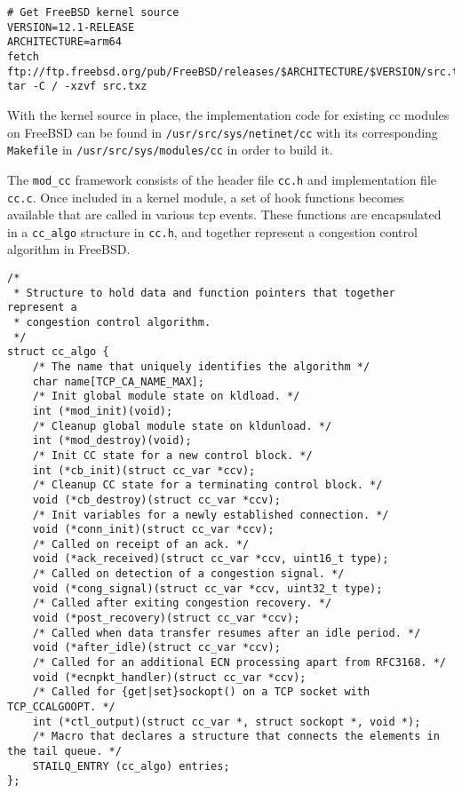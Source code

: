 \begin{verbatim}
# Get FreeBSD kernel source
VERSION=12.1-RELEASE
ARCHITECTURE=arm64
fetch ftp://ftp.freebsd.org/pub/FreeBSD/releases/$ARCHITECTURE/$VERSION/src.txz
tar -C / -xzvf src.txz
\end{verbatim}
With the kernel source in place, the implementation code for existing \gls{cc} modules on FreeBSD can be found in \lstinline{/usr/src/sys/netinet/cc} with its corresponding \lstinline{Makefile} in \lstinline{/usr/src/sys/modules/cc} in order to build it.

The \lstinline{mod_cc} framework consists of the header file \lstinline{cc.h} and implementation file \lstinline{cc.c}. Once included in a kernel module, a set of hook functions becomes available that are called in various \gls{tcp} events. These functions are encapsulated in a \lstinline{cc_algo} structure in \lstinline{cc.h}, and together represent a congestion control algorithm in FreeBSD.

\begin{code}
\begin{verbatim}
/*
 * Structure to hold data and function pointers that together represent a
 * congestion control algorithm.
 */
struct cc_algo {
    /* The name that uniquely identifies the algorithm */
    char name[TCP_CA_NAME_MAX];
    /* Init global module state on kldload. */
    int	(*mod_init)(void);
    /* Cleanup global module state on kldunload. */
    int (*mod_destroy)(void);
    /* Init CC state for a new control block. */
    int	(*cb_init)(struct cc_var *ccv);
    /* Cleanup CC state for a terminating control block. */
    void (*cb_destroy)(struct cc_var *ccv);
    /* Init variables for a newly established connection. */
    void (*conn_init)(struct cc_var *ccv);
    /* Called on receipt of an ack. */
    void (*ack_received)(struct cc_var *ccv, uint16_t type);
    /* Called on detection of a congestion signal. */
    void (*cong_signal)(struct cc_var *ccv, uint32_t type);
    /* Called after exiting congestion recovery. */
    void (*post_recovery)(struct cc_var *ccv);
    /* Called when data transfer resumes after an idle period. */
    void (*after_idle)(struct cc_var *ccv);
    /* Called for an additional ECN processing apart from RFC3168. */
    void (*ecnpkt_handler)(struct cc_var *ccv);
    /* Called for {get|set}sockopt() on a TCP socket with TCP_CCALGOOPT. */
    int (*ctl_output)(struct cc_var *, struct sockopt *, void *);
    /* Macro that declares a structure that connects the elements in the tail queue. */
    STAILQ_ENTRY (cc_algo) entries;
};
\end{verbatim}
\label{code:freebsd-cc}
\end{code}

